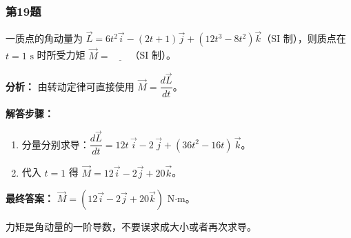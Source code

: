 \documentclass[12pt,a4paper]{ctexart}
\begin{document}
\subsubsection*{第19题}
\begin{tcolorbox}[colback=gray!2!white,colframe=black!60,title={题目}]
一质点的角动量为 \(\vec L=6t^2\vec i-(2t+1)\vec j+(12t^3-8t^2)\vec k\)（SI 制），则质点在 \(t=1\text{ s}\) 时所受力矩 \(\vec M=\underline{\qquad}\)（SI 制）。\par
\end{tcolorbox}
\begin{tcolorbox}[colback=blue!2!white,colframe=blue!55!black,title={完整答案}]
\textbf{分析：}
由转动定律可直接使用 \(\vec M=\dfrac{d\vec L}{dt}\)。\par
\textbf{解答步骤：}
\begin{enumerate}
\item 分量分别求导：\(\dfrac{d\vec L}{dt}=12t\,\vec i-2\,\vec j+(36t^2-16t)\,\vec k\)。
\item 代入 \(t=1\) 得 \(\vec M=12\vec i-2\vec j+20\vec k\)。
\end{enumerate}
\textbf{最终答案：}
\(\vec M=(12\vec i-2\vec j+20\vec k)\text{ N·m}\)。\par
\end{tcolorbox}
\begin{tcolorbox}[colback=red!2!white,colframe=red!55!black,title={易错点}]
力矩是角动量的一阶导数，不要误求成大小或者再次求导。\par
\end{tcolorbox}
\end{document}
